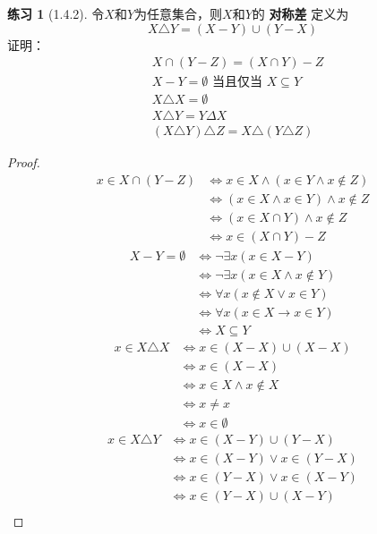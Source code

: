 \documentclass[11pt]{article}
\theoremstyle{definition}
\newtheorem{exercise}{练习}
\begin{document}
\begin{exercise}[1.4.2]
令\(X\)和\(Y\)为任意集合，则\(X\)和\(Y\)的 \textbf{对称差} 定义为
\begin{equation*}
X\triangle Y=(X-Y)\cup(Y-X)
\end{equation*}
证明：
\begin{align*}
&X\cap(Y-Z)=(X\cap Y)-Z\\
&X-Y=\emptyset\text{ 当且仅当 }X\subseteq Y\\
&X\triangle X=\emptyset\\
&X\triangle Y=Y\Delta X\\
&(X\triangle Y)\triangle Z=X\triangle(Y\triangle Z)
\end{align*}
\end{exercise}

\begin{proof}
\begin{align*}
x\in X\cap(Y-Z)&\Leftrightarrow x\in X\wedge (x\in Y\wedge x\notin Z)\\
&\Leftrightarrow (x\in X\wedge x\in Y)\wedge x\notin Z\\
&\Leftrightarrow (x\in X\cap Y)\wedge x\notin Z\\
&\Leftrightarrow x\in (X\cap Y)-Z
\end{align*}
\begin{align*}
X-Y=\emptyset&\Leftrightarrow \neg\exists x(x\in X-Y)\\
&\Leftrightarrow \neg\exists x(x\in X\wedge x\notin Y)\\
&\Leftrightarrow \forall x(x\notin X\vee x\in Y)\\
&\Leftrightarrow \forall x(x\in X\to x\in Y)\\
&\Leftrightarrow X\subseteq Y
\end{align*}
\begin{align*}
x\in X\triangle X&\Leftrightarrow x\in(X-X)\cup(X-X)\\
&\Leftrightarrow x\in(X-X)\\
&\Leftrightarrow x\in X\wedge x\notin X\\
&\Leftrightarrow x\neq x\\
&\Leftrightarrow x\in\emptyset
\end{align*}
\begin{align*}
x\in X\triangle Y&\Leftrightarrow x\in (X-Y)\cup(Y-X)\\
&\Leftrightarrow x\in (X-Y)\vee x\in (Y-X)\\
&\Leftrightarrow x\in (Y-X)\vee x\in (X-Y)\\
&\Leftrightarrow x\in(Y-X)\cup(X-Y)\\

\end{align*}
\end{proof}
\end{document}
